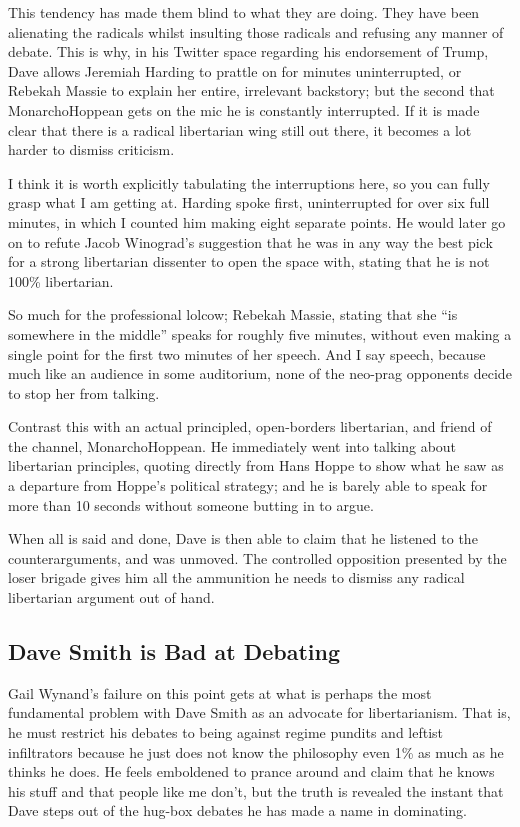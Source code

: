 \documentclass[11pt]{article}
\begin{document}
This tendency has made them blind to what they are doing. They have been alienating the radicals whilst insulting those radicals and refusing any manner of debate. This is why, in his Twitter space regarding his endorsement of Trump, Dave allows Jeremiah Harding to prattle on for minutes uninterrupted, or Rebekah Massie to explain her entire, irrelevant backstory; but the second that MonarchoHoppean gets on the mic he is constantly interrupted. If it is made clear that there is a radical libertarian wing still out there, it becomes a lot harder to dismiss criticism.

I think it is worth explicitly tabulating the interruptions here, so you can fully grasp what I am getting at. Harding spoke first, uninterrupted for over six full minutes, in which I counted him making eight separate points. He would later go on to refute Jacob Winograd's suggestion that he was in any way the best pick for a strong libertarian dissenter to open the space with, stating that he is not 100\% libertarian.

So much for the professional lolcow; Rebekah Massie, stating that she ``is somewhere in the middle'' speaks for roughly five minutes, without even making a single point for the first two minutes of her speech. And I say speech, because much like an audience in some auditorium, none of the neo-prag opponents decide to stop her from talking.

Contrast this with an actual principled, open-borders libertarian, and friend of the channel, MonarchoHoppean. He immediately went into talking about libertarian principles, quoting directly from Hans Hoppe to show what he saw as a departure from Hoppe's political strategy; and he is barely able to speak for more than 10 seconds without someone butting in to argue.

When all is said and done, Dave is then able to claim that he listened to the counterarguments, and was unmoved. The controlled opposition presented by the loser brigade gives him all the ammunition he needs to dismiss any radical libertarian argument out of hand.
\subsection{Dave Smith is Bad at Debating}
\label{sec:orgea35ba1}
Gail Wynand's failure on this point gets at what is perhaps the most fundamental problem with Dave Smith as an advocate for libertarianism. That is, he must restrict his debates to being against regime pundits and leftist infiltrators because he just does not know the philosophy even 1\% as much as he thinks he does. He feels emboldened to prance around and claim that he knows his stuff and that people like me don't, but the truth is revealed the instant that Dave steps out of the hug-box debates he has made a name in dominating.
\end{document}
